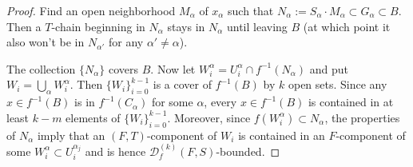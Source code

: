 \documentclass[12pt]{article}
\begin{document}
{\begin{proof}



Find an open neighborhood $M_\alpha$ of $x_\alpha$ such that $N_\alpha := S_\alpha\cdot M_\alpha\subset G_\alpha\subset B$.  Then a $T$-chain beginning in $N_\alpha$ stays in $N_\alpha$ until leaving $B$ (at which point it also won't be in $N_{\alpha'}$ for any $\alpha'\neq \alpha$).  

The collection $\{N_\alpha\}$ covers $B$.  Now let $W_i^{\alpha} = U_i^{\alpha}\cap f^{-1}(N_{\alpha})$ and put $W_i = \bigcup_\alpha W_i^{\alpha}$.  Then $\{W_i\}_{i=0}^{k-1}$ is a cover of $f^{-1}(B)$ by $k$ open sets.  Since any $x\in f^{-1}(B)$ is in $f^{-1}(C_\alpha)$ for some $\alpha$, every $x\in f^{-1}(B)$ is contained in at least $k-m$ elements of $\{W_i\}_{i=0}^{k-1}$.  Moreover, since $f(W_i^{\alpha})\subset N_{\alpha}$, the properties of $N_\alpha$ imply that an $(F, T)$-component of $W_i$ is contained in an $F$-component of some $W_i^{\alpha}\subset U_i^{\alpha_j}$ and is hence $\mathcal{D}^{(k)}_f(F, S)$-bounded. \end{proof}



 \label{more chain definition}

}
\end{document}
